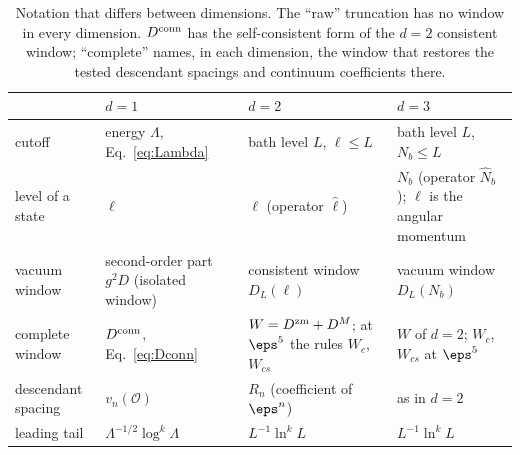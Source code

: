 \begin{table}[ht]
\centering\footnotesize\renewcommand{\arraystretch}{1.2}
\begin{tabular}{@{}p{3.3cm}p{3.6cm}p{4.1cm}p{3.6cm}@{}}
\toprule
 & $d=1$ & $d=2$ & $d=3$ \\
\midrule
cutoff & energy $\Lambda$, Eq.~\eqref{eq:Lambda} & bath level $L$, $\ell\le L$ & bath level $L$, $N_b\le L$ \\
level of a state & $\ell$ & $\ell$ (operator $\hat\ell$) & $N_b$ (operator $\hat N_b$); $\ell$ is the angular momentum \\
vacuum window & second-order part $g^2D$ (isolated window) & consistent window $D_L(\ell)$ & vacuum window $D_L(N_b)$ \\
complete window & $D^{\rm conn}$, Eq.~\eqref{eq:Dconn} & $W=D^{\rm zm}+D^M$; at $\eps^5$ the rules $W_c$, $W_{cs}$ & $W$ of $d=2$; $W_c$, $W_{cs}$ at $\eps^5$ \\
descendant spacing & $v_n(\mathcal O)$ & $R_n$ (coefficient of $\eps^n$) & as in $d=2$ \\
leading tail & $\Lambda^{-1/2}\log^k\Lambda$ & $L^{-1}\ln^kL$ & $L^{-1}\ln^kL$ \\
\bottomrule
\end{tabular}
\caption{Notation that differs between dimensions. The ``raw'' truncation has no window in every dimension. $D^{\rm conn}$
has the self-consistent form of the $d=2$ consistent window; ``complete'' names, in each dimension, the window that
restores the tested descendant spacings and continuum coefficients there.}
\label{tab:notation}
\end{table}
